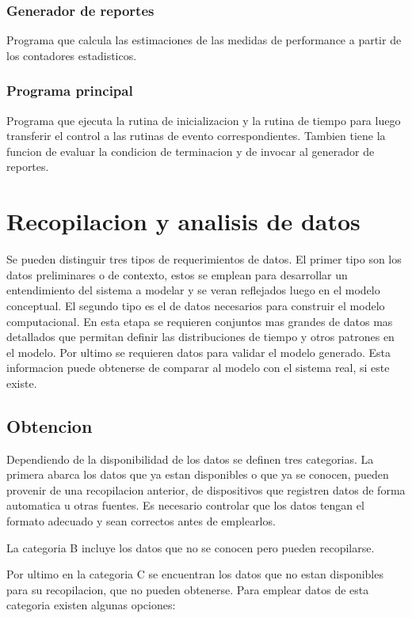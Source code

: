\documentclass[a4paper]{article}
\begin{document}
\subsubsection*{Generador de reportes}
Programa que calcula las estimaciones de las medidas de performance %
a partir de los contadores estadisticos.

\subsubsection*{Programa principal}
Programa que ejecuta la rutina de inicializacion y la rutina de tiempo para luego 
transferir el control a las rutinas de evento correspondientes. Tambien tiene la 
funcion de evaluar la condicion de terminacion y de invocar al generador de reportes.


\section*{Recopilacion y analisis de datos}
Se pueden distinguir tres tipos de requerimientos de datos. El primer tipo son 
los datos preliminares o de contexto, estos se emplean para desarrollar un 
entendimiento del sistema a modelar y se veran reflejados luego en el modelo 
conceptual.
El segundo tipo es el de datos necesarios para construir el modelo computacional.
En esta etapa se requieren conjuntos mas grandes de datos mas detallados que 
permitan definir las distribuciones de tiempo y otros patrones en el modelo.
Por ultimo se requieren datos para validar el modelo generado.
Esta informacion puede obtenerse de comparar al modelo con el sistema real,
si este existe.

\subsection*{Obtencion}
Dependiendo de la disponibilidad de los datos se definen tres categorias.
La primera abarca los datos que ya estan disponibles o que ya se conocen, 
pueden provenir de una recopilacion anterior, de dispositivos que registren
datos de forma automatica u otras fuentes. Es necesario controlar que 
los datos tengan el formato adecuado y sean correctos antes de emplearlos.

La categoria B incluye los datos que no se conocen pero pueden recopilarse.

Por ultimo en la categoria C se encuentran los datos que no estan disponibles 
para su recopilacion, que no pueden obtenerse.
Para emplear datos de esta categoria existen algunas opciones:
\end{document}
